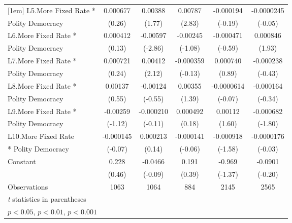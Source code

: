 {\begin{tabular}{l*{5}{c}}
[1em]
L5.More Fixed Rate *&    0.000677         &     0.00388         &     0.00787\sym{**} &   -0.000194         &  -0.0000245         \\
Polity Democracy    &      (0.26)         &      (1.77)         &      (2.83)         &     (-0.19)         &     (-0.05)         \\
[1em]
L6.More Fixed Rate *&    0.000412         &    -0.00597\sym{**} &    -0.00245         &   -0.000471         &    0.000846         \\
Polity Democracy    &      (0.13)         &     (-2.86)         &     (-1.08)         &     (-0.59)         &      (1.93)         \\
[1em]
L7.More Fixed Rate *&    0.000721         &     0.00412\sym{*}  &   -0.000359         &    0.000740         &   -0.000238         \\
Polity Democracy    &      (0.24)         &      (2.12)         &     (-0.13)         &      (0.89)         &     (-0.43)         \\
[1em]
L8.More Fixed Rate *&     0.00137         &    -0.00124         &     0.00355         &  -0.0000614         &   -0.000164         \\
Polity Democracy    &      (0.55)         &     (-0.55)         &      (1.39)         &     (-0.07)         &     (-0.34)         \\
[1em]
L9.More Fixed Rate *&    -0.00259         &   -0.000210         &    0.000492         &     0.00112         &   -0.000682         \\
Polity Democracy    &     (-1.12)         &     (-0.11)         &      (0.18)         &      (1.60)         &     (-1.80)         \\
[1em]
L10.More Fixed Rate &   -0.000145         &    0.000213         &   -0.000141         &   -0.000918         &  -0.0000176         \\
* Polity Democracy  &     (-0.07)         &      (0.14)         &     (-0.06)         &     (-1.58)         &     (-0.03)         \\
[1em]
Constant            &       0.228         &     -0.0466         &       0.191         &      -0.969         &     -0.0901         \\
                    &      (0.46)         &     (-0.09)         &      (0.39)         &     (-1.37)         &     (-0.20)         \\
\hline
Observations        &        1063         &        1064         &         884         &        2145         &        2565         \\
\hline\hline
\multicolumn{6}{l}{\footnotesize \textit{t} statistics in parentheses}\\
\multicolumn{6}{l}{\footnotesize \sym{*} \(p<0.05\), \sym{**} \(p<0.01\), \sym{***} \(p<0.001\)}\\
\end{tabular}
}
